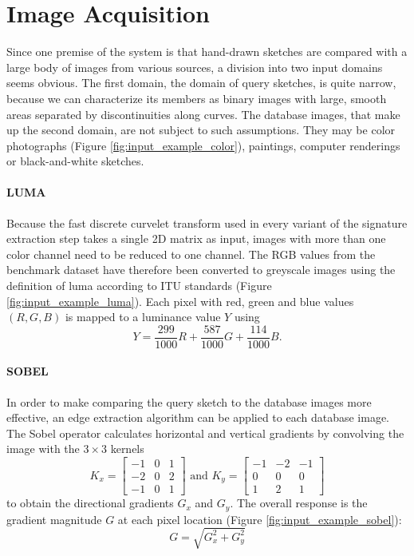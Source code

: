 \section{Image Acquisition}

Since one premise of the system is that hand-drawn sketches are compared with a
large body of images from various sources, a division into two input domains
seems obvious. The first domain, the domain of query sketches, is quite narrow,
because we can characterize its members as binary images with large, smooth
areas separated by discontinuities along curves. The database images, that make
up the second domain, are not subject to such assumptions. They may be color
photographs (Figure \ref{fig:input_example_color}), paintings, computer
renderings or black-and-white sketches.

\paragraph{LUMA}

Because the fast discrete curvelet transform used in every variant of the
signature extraction step takes a single 2D matrix as input, images with more
than one color channel need to be reduced to one channel. The RGB values from
the benchmark dataset have therefore been converted to greyscale images using
the definition of luma according to ITU standards \autocite{_parameter_2002}
(Figure \ref{fig:input_example_luma}).  Each pixel with red, green and blue
values $(R, G, B)$ is mapped to a luminance value $Y$ using
\begin{equation*}
    Y = \frac{299}{1000}R + \frac{587}{1000}G + \frac{114}{1000}B.
\end{equation*}

\paragraph{SOBEL}

In order to make comparing the query sketch to the database images more
effective, an edge extraction algorithm can be applied to each database image.
The Sobel operator calculates horizontal and vertical gradients by convolving
the image with the $3 \times 3$ kernels
\begin{equation*}
    K_x =
    \begin{bmatrix}
        -1 & 0 & 1 \\
        -2 & 0 & 2 \\
        -1 & 0 & 1
    \end{bmatrix}
    \text{ and }
    K_y =
    \begin{bmatrix}
        -1 & -2 & -1 \\
         0 &  0 &  0 \\
         1 &  2 &  1
    \end{bmatrix}
\end{equation*}
to obtain the directional gradients $G_x$ and $G_y$. The overall response is
the gradient magnitude $G$ at each pixel location (Figure
\ref{fig:input_example_sobel}):
\begin{equation*}
    G = \sqrt{G_x^2 + G_y^2}
\end{equation*}


